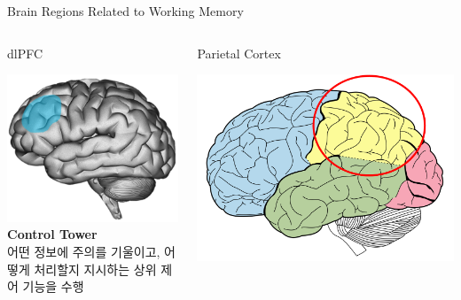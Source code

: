 \documentclass{beamer}
\begin{document}
\begin{frame}{Brain Regions Related to Working Memory}
  \begin{columns}
    \begin{column}{0.31\textwidth}
      \begin{block}{dlPFC}
        \begin{minipage}[t][5cm][c]{\textwidth}
          \centering
          \includegraphics[width=\textwidth]{image/working_memory_b1}
          \textbf{Control Tower}\\
          어떤 정보에 주의를 기울이고, 어떻게 처리할지 지시하는 상위 제어 기능을 수행
        \end{minipage}
      \end{block}
    \end{column}
    \hfill
    \begin{column}{0.31\textwidth}
      \begin{block}{Parietal Cortex}
        \begin{minipage}[t][5cm][c]{\textwidth}
          \centering
          \includegraphics[width=\textwidth]{image/working_memory_b2}\\~\\~\\

\end{minipage}
\end{block}
\end{column}
\end{columns}
\end{frame}
\end{document}

